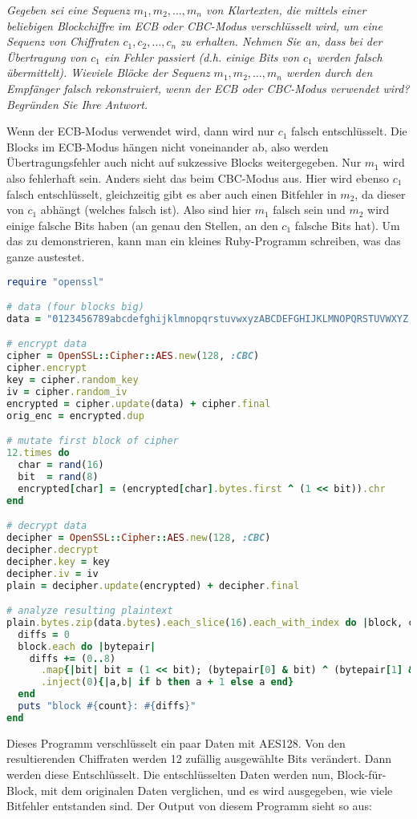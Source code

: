 \documentclass[
  ngerman,
  DIV=12
]{scrartcl}
\begin{document}
\bigskip\noindent
\emph{Gegeben sei eine Sequenz $m_1, m_2, \dots, m_n$ von Klartexten, die mittels einer beliebigen Blockchiffre im ECB oder CBC-Modus verschlüsselt wird, um eine Sequenz von Chiffraten $c_1, c_2, \dots, c_n$ zu erhalten. Nehmen Sie an, dass bei der Übertragung von $c_1$ ein Fehler passiert (d.h. einige Bits von $c_1$ werden falsch übermittelt). Wieviele Blöcke der Sequenz $m_1, m_2, \dots , m_n$ werden durch den Empfänger falsch rekonstruiert, wenn der ECB oder CBC-Modus verwendet wird? Begründen Sie Ihre Antwort.}

\medskip\noindent
Wenn der ECB-Modus verwendet wird, dann wird nur $c_1$ falsch entschlüsselt. Die Blocks im ECB-Modus hängen nicht voneinander ab, also werden Übertragungsfehler auch nicht auf sukzessive Blocks weitergegeben. Nur $m_1$ wird also fehlerhaft sein. 
Anders sieht das beim CBC-Modus aus. Hier wird ebenso $c_1$ falsch entschlüsselt,  gleichzeitig gibt es aber auch einen Bitfehler in $m_2$, da dieser von $c_1$ abhängt (welches falsch ist). Also sind hier $m_1$ falsch sein und $m_2$ wird einige falsche Bits haben (an genau den Stellen, an den $c_1$ falsche Bits hat).
Um das zu demonstrieren, kann man ein kleines Ruby-Programm schreiben, was das ganze austestet. 
\begin{lstlisting}[language=ruby]
require "openssl"

# data (four blocks big)
data = "0123456789abcdefghijklmnopqrstuvwxyzABCDEFGHIJKLMNOPQRSTUVWXYZ;"

# encrypt data
cipher = OpenSSL::Cipher::AES.new(128, :CBC)
cipher.encrypt
key = cipher.random_key
iv = cipher.random_iv
encrypted = cipher.update(data) + cipher.final
orig_enc = encrypted.dup

# mutate first block of cipher
12.times do
  char = rand(16)
  bit  = rand(8)
  encrypted[char] = (encrypted[char].bytes.first ^ (1 << bit)).chr
end

# decrypt data
decipher = OpenSSL::Cipher::AES.new(128, :CBC)
decipher.decrypt
decipher.key = key
decipher.iv = iv
plain = decipher.update(encrypted) + decipher.final

# analyze resulting plaintext
plain.bytes.zip(data.bytes).each_slice(16).each_with_index do |block, count|
  diffs = 0
  block.each do |bytepair|
    diffs += (0..8)
      .map{|bit| bit = (1 << bit); (bytepair[0] & bit) ^ (bytepair[1] & bit) != 0}
      .inject(0){|a,b| if b then a + 1 else a end}
  end
  puts "block #{count}: #{diffs}"
end  
\end{lstlisting}
Dieses Programm verschlüsselt ein paar Daten mit AES128. Von den resultierenden Chiffraten werden 12 zufällig ausgewählte Bits verändert. Dann werden diese Entschlüsselt. Die entschlüsselten Daten werden nun, Block-für-Block, mit dem originalen Daten verglichen, und es wird ausgegeben, wie viele Bitfehler entstanden sind. Der Output von diesem Programm sieht so aus:
\end{document}
